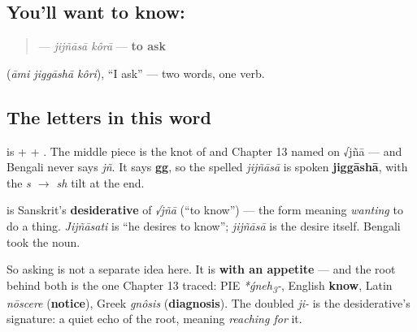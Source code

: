 \subsection*{You'll want to know:  }
\begin{quote}
\textbf{ } — \emph{jijñāsā kôrā} — \textbf{to ask}
\end{quote}

   (\emph{āmi jiggāshā kôri}), \textquotedblleft{}I ask\textquotedblright{} — two words, one verb.

\subsection*{The letters in this word}
\textbf{} is \textbf{} + \textbf{} + \textbf{}. The middle piece \textbf{} is the knot of \textbf{} and \textbf{} Chapter 13 named on √jñā — and Bengali never says \emph{jñ}. It says \textbf{gg}, so the spelled \emph{jijñāsā} is spoken \textbf{jiggāshā}, with the \emph{s $\to$ sh} tilt at the end.

\begin{cousinweb}
\textbf{} is Sanskrit's \textbf{desiderative} of \emph{√jñā} (\textquotedblleft{}to know\textquotedblright{}) — the form meaning \emph{wanting} to do a thing. \emph{Jijñāsati} is \textquotedblleft{}he desires to know\textquotedblright{}; \emph{jijñāsā} is the desire itself. Bengali took the noun.

So asking is not a separate idea here. It is \textbf{ with an appetite} — and the root behind both is the one Chapter 13 traced: PIE \emph{*ǵneh\textsubscript{3}-}, English \textbf{know}, Latin \emph{nōscere} (\textbf{notice}), Greek \emph{gnôsis} (\textbf{diagnosis}). The doubled \emph{ji-} is the desiderative's signature: a quiet echo of the root, meaning \emph{reaching for} it.
\end{cousinweb}

